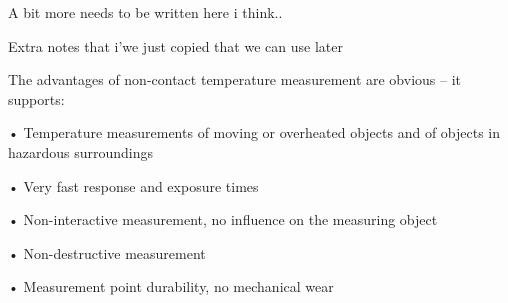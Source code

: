 A bit more needs to be written here i think..


Extra notes that i'we just copied that we can use later 

The advantages of non-contact temperature measurement
are obvious – it supports:

• Temperature measurements of moving or overheated
objects and of objects in hazardous surroundings

• Very fast response and exposure times

• Non-interactive measurement, no influence on
the measuring object

• Non-destructive measurement

• Measurement point durability, no mechanical wear




